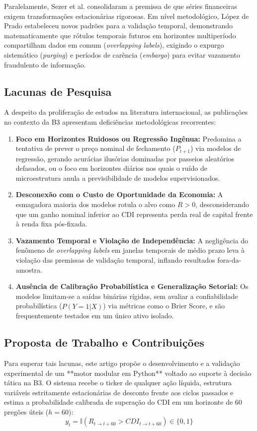 \documentclass[conference]{IEEEtran}
\begin{document}
Paralelamente, Sezer et al. \cite{sezer2020financial} consolidaram a premissa de que séries financeiras exigem transformações estacionárias rigorosas. Em nível metodológico, López de Prado \cite{deprado2018advances} estabeleceu novos padrões para a validação temporal, demonstrando matematicamente que rótulos temporais futuros em horizontes multiperíodo compartilham dados em comum (\textit{overlapping labels}), exigindo o expurgo sistemático (\textit{purging}) e períodos de carência (\textit{embargo}) para evitar vazamento fraudulento de informação.

\subsection{Lacunas de Pesquisa}
A despeito da proliferação de estudos na literatura internacional, as publicações no contexto da B3 apresentam deficiências metodológicas recorrentes:
\begin{enumerate}
    \item \textbf{Foco em Horizontes Ruidosos ou Regressão Ingênua:} Predomina a tentativa de prever o preço nominal de fechamento ($P_{t+1}$) via modelos de regressão, gerando acurácias ilusórias dominadas por passeios aleatórios defasados, ou o foco em horizontes diários nos quais o ruído de microestrutura anula a previsibilidade de modelos supervisionados.
    \item \textbf{Desconexão com o Custo de Oportunidade da Economia:} A esmagadora maioria dos modelos rotula o alvo como $R > 0$, desconsiderando que um ganho nominal inferior ao CDI representa perda real de capital frente à renda fixa pós-fixada.
    \item \textbf{Vazamento Temporal e Violação de Independência:} A negligência do fenômeno de \textit{overlapping labels} em janelas temporais de médio prazo leva à violação das premissas de validação temporal, inflando resultados fora-da-amostra.
    \item \textbf{Ausência de Calibração Probabilística e Generalização Setorial:} Os modelos limitam-se a saídas binárias rígidas, sem avaliar a confiabilidade probabilística ($\hat{P}(Y=1|X)$) via métricas como o Brier Score, e são frequentemente testados em um único ativo isolado.
\end{enumerate}

\subsection{Proposta de Trabalho e Contribuições}
Para superar tais lacunas, este artigo propõe o desenvolvimento e a validação experimental de um **motor modular em Python** voltado ao suporte à decisão tática na B3. O sistema recebe o ticker de qualquer ação líquida, estrutura variáveis estritamente estacionárias de desconto frente aos ciclos passados e estima a probabilidade calibrada de superação do CDI em um horizonte de 60 pregões úteis ($h=60$):
\begin{equation}
y_t = \mathbb{I}(R_{t \to t+60} > CDI_{t \to t+60}) \in \{0, 1\}
\end{equation}
\end{document}
